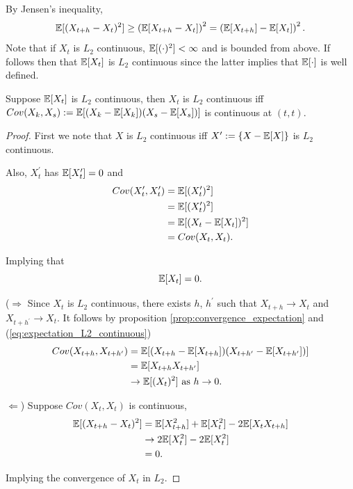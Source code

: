 \documentclass[../TGMAFFIRO]{subfiles}
\begin{document}
\begin{remark}
By Jensen's inequality,
	\begin{equation}
		\mathbb{E}[(X_{t+h} - X_{t})^2] \geq \left(\mathbb{E}[X_{t+h} - X_{t}]\right)^2	= \left(\mathbb{E}[X_{t+h}] - \mathbb{E}[X_{t}]\right)^2.
	\end{equation}
Note that if $X_t$ is $L_2$ continuous, $\mathbb{E}[(\cdot)^2] < \infty$ and is bounded from above. If follows then that $\mathbb{E}[X_t]$ is $L_2$ continuous since the latter implies that $\mathbb{E}[\cdot]$ is well defined.
\end{remark}

\begin{theorem}
	Suppose $\mathbb{E}[X_t]$ is $L_2$ continuous, then $X_t$ is $L_2$ continuous iff $Cov(X_k, X_s) := \mathbb{E}[(X_k - \mathbb{E}[X_k])(X_s - \mathbb{E}[X_s])]$ is continuous at $(t,t)$.
\end{theorem}

\begin{proof}
First we note that $X$ is $L_2$ continuous iff $X^\prime:= \{X - \mathbb{E}[X]\}$ is $L_2$ continuous.

Also, $X_t^\prime$ has $\mathbb{E}[X_t^\prime] = 0$ and
\begin{align*}
	Cov(X_t^\prime, X_t^\prime) &= \mathbb{E}[(X_t^\prime) ^ 2] \\
								&= \mathbb{E}[(X_t^\prime)^2] \\
								&= \mathbb{E}[(X_t - \mathbb{E}[X_t])^2] \\
								&= Cov(X_t, X_t).
\end{align*}

Implying that 
\begin{equation}\label{eq:expectation_L2_continuous}
  \mathbb{E}[X_t] = 0.
\end{equation}


($\Rightarrow$ Since $X_t$ is $L_2$ continuous, there exists $h$, $h^\prime$ such that $X_{t+h} \to X_t$ and $X_{t+h^\prime} \to X_t$. It follows by proposition \ref{prop:convergence_expectation} and (\ref{eq:expectation_L2_continuous})
\begin{align*}
	Cov(X_{t+h}, X_{t+h^\prime}) &= \mathbb{E}[(X_{t+h} - \mathbb{E}[X_{t+h}])(X_{t+h^\prime} - \mathbb{E}[X_{t+h^\prime}])]\\
								 &= \mathbb{E}[X_{t+h}X_{t+h^\prime}]\\
								 &\to \mathbb{E}[(X_{t})^2] \text{ as } h \to 0.
\end{align*}

$\Leftarrow$) Suppose $Cov(X_t, X_t)$ is continuous,
\begin{align*}
	\mathbb{E}[(X_{t+h} - X_t)^2] &= \mathbb{E}[X^2_{t+h}] + \mathbb{E}[X^2_{t}] - 2\mathbb{E}[X_{t}X_{t+h}]\\
						  &\to 2\mathbb{E}[X^2_t] -  2\mathbb{E}[X^2_t]\\
						  &= 0.
\end{align*}

Implying the convergence of $X_t$ in $L_2$.
\end{proof}
\end{document}
